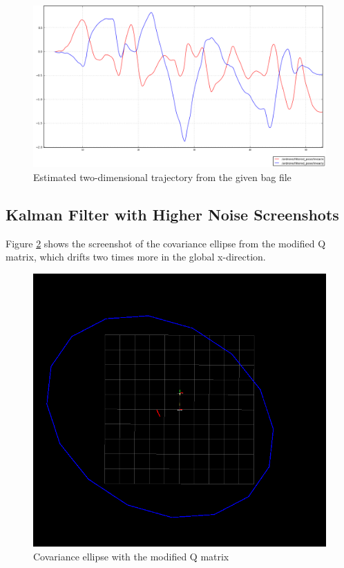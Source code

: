 \documentclass[14pt,a4paper]{article}
\begin{document}
	\begin{figure}[htbp]
	\centering
	\includegraphics[scale=0.4]{filtered_pose.png}
  	\caption{Estimated two-dimensional trajectory from the given bag file}
    \label{graph:filtered_pose}
	\end{figure}
	

	\subsection{Kalman Filter with Higher Noise Screenshots}
	
		Figure \ref{graph:Q_2Times} shows the screenshot of the covariance ellipse from the modified Q matrix, which drifts two times more in the global x-direction.\\
	
	\begin{figure}[htbp]
	\includegraphics[scale=0.5]{Q_x_2Times.png}
  	\caption{Covariance ellipse with the modified Q matrix}
    \label{graph:Q_2Times}
	\end{figure}
	
\end{document}

